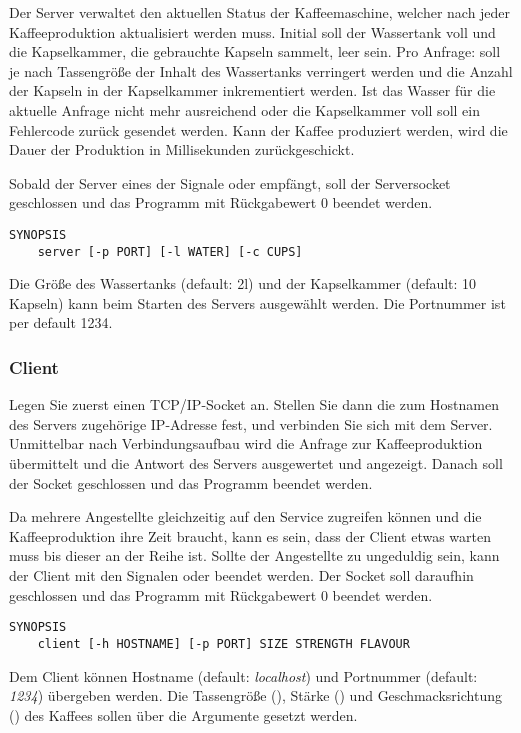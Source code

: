 Der Server verwaltet den aktuellen Status der Kaffeemaschine, welcher nach
jeder Kaffeeproduktion aktualisiert werden muss. Initial soll der Wassertank
voll und die Kapselkammer, die gebrauchte Kapseln sammelt, leer sein. Pro
Anfrage: soll je nach Tassengröße der Inhalt des Wassertanks verringert werden
und die Anzahl der Kapseln in der Kapselkammer inkrementiert werden. Ist das
Wasser für die aktuelle Anfrage nicht mehr ausreichend oder die Kapselkammer
voll soll ein Fehlercode zurück gesendet werden. Kann der Kaffee produziert
werden, wird die Dauer der Produktion in Millisekunden zurückgeschickt.

Sobald der Server eines der Signale  oder
 empfängt, soll der Serversocket geschlossen und das
Programm mit Rückgabewert 0 beendet werden.

\begin{verbatim}
SYNOPSIS
    server [-p PORT] [-l WATER] [-c CUPS]
\end{verbatim}

Die Größe des Wassertanks (default: 2l) und der Kapselkammer (default: 10
Kapseln) kann beim Starten des Servers ausgewählt werden. Die Portnummer ist
per default 1234.

\subsubsection*{Client}
Legen Sie zuerst einen TCP/IP-Socket an. Stellen Sie dann die zum Hostnamen des
Servers zugehörige IP-Adresse fest, und verbinden Sie sich mit dem
Server. Unmittelbar nach Verbindungsaufbau wird die Anfrage zur
Kaffeeproduktion übermittelt und die Antwort des Servers ausgewertet und
angezeigt. Danach soll der Socket geschlossen und das Programm beendet werden.

Da mehrere Angestellte gleichzeitig auf den Service zugreifen können und die
Kaffeeproduktion ihre Zeit braucht, kann es sein, dass der Client etwas warten
muss bis dieser an der Reihe ist. Sollte der Angestellte zu ungeduldig sein,
kann der Client mit den Signalen  oder 
beendet werden. Der Socket soll daraufhin geschlossen und das Programm mit
Rückgabewert 0 beendet werden.

\begin{verbatim}
SYNOPSIS
    client [-h HOSTNAME] [-p PORT] SIZE STRENGTH FLAVOUR
\end{verbatim}

Dem Client können Hostname (default: \emph{localhost}) und Portnummer (default:
\emph{1234}) übergeben werden. Die Tassengröße (), Stärke
() und Geschmacksrichtung () des Kaffees
sollen über die Argumente gesetzt werden.

